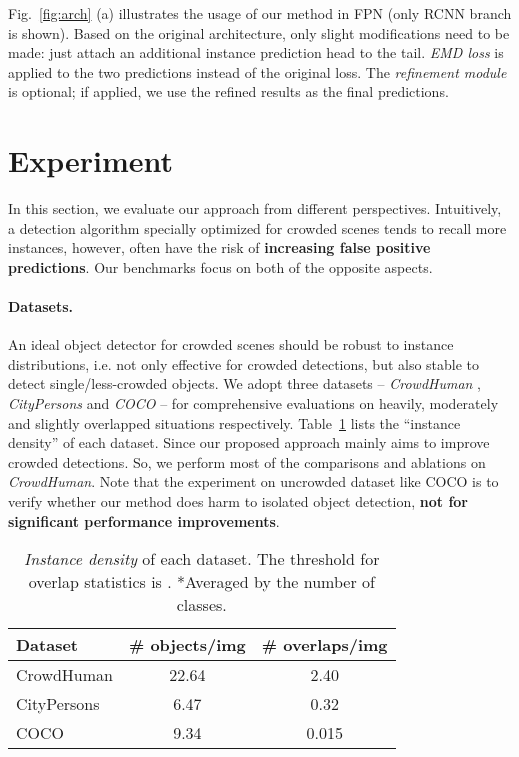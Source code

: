 \documentclass[10pt,twocolumn,letterpaper]{article}
\begin{document}
Fig.~\ref{fig:arch} (a) illustrates the usage of our method in FPN (only RCNN branch is shown). Based on the original architecture, only slight modifications need to be made: just attach an additional instance prediction head to the tail. \emph{EMD loss} is applied to the two predictions instead of the original loss. The \emph{refinement module} is optional; if applied, we use the refined results as the final predictions.

\section{Experiment}
\label{sec:exp}
In this section, we evaluate our approach from different perspectives. Intuitively, a detection algorithm specially optimized for crowded scenes tends to recall more instances, however, often have the risk of \textbf{increasing false positive predictions}. Our benchmarks focus on both of the opposite aspects. 

\paragraph{Datasets.}
An ideal object detector for crowded scenes should be robust to instance distributions, i.e. not only effective for crowded detections, but also stable to detect single/less-crowded objects. We adopt three datasets -- \emph{CrowdHuman} \cite{shao2018crowdhuman}, \emph{CityPersons} \cite{zhang2017citypersons} and \emph{COCO} \cite{lin2014microsoft} -- for comprehensive evaluations on heavily, moderately and slightly overlapped situations respectively. Table~\ref{tbl:datasets} lists the ``instance density'' of each dataset.  Since our proposed approach mainly aims to improve crowded detections. So, we perform most of the comparisons and ablations on \emph{CrowdHuman}. Note that the experiment on uncrowded dataset like COCO is to verify whether our method does harm to isolated object detection, \textbf{not for significant performance improvements}. 
\begin{table}[t]
   \centering
   \begin{tabular}{l|c|c}
      \toprule
      Dataset & \# objects/img & \# overlaps/img  \\
      \hline
      CrowdHuman \cite{shao2018crowdhuman} & 22.64  & 2.40 \\
      CityPersons \cite{zhang2017citypersons} & 6.47  & 0.32 \\
      COCO \cite{lin2014microsoft} & 9.34  & 0.015 \\
      \bottomrule
   \end{tabular}
   \caption{\emph{Instance density} of each dataset.  The threshold for overlap statistics is .  *Averaged by the number of classes.}
   \label{tbl:datasets}
\end{table} 
 
\end{document}

